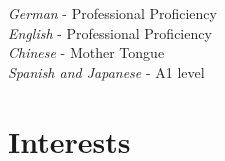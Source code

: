 \documentclass[10pt]{article} %
\begin{document}

{
\textit{German} - Professional Proficiency\\
\textit{English} - Professional Proficiency\\
\textit{Chinese} - Mother Tongue\\
\textit{Spanish and Japanese} - A1 level\\
}




\section{Interests}


\end{document}
